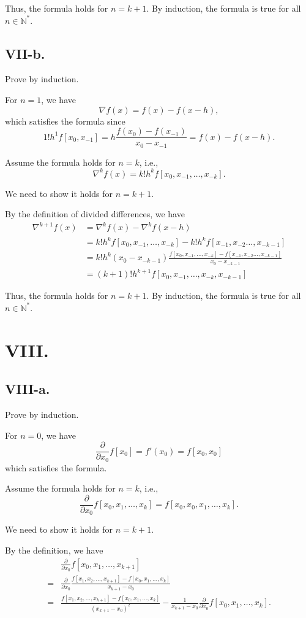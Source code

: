 \documentclass[a4paper]{article}
\begin{document}
Thus, the formula holds for $n = k + 1$. By induction, the formula is true for all $n \in \mathbb{N}^*$.

\subsection*{VII-b.}
Prove by induction.

For $n = 1$, we have
$$
  \nabla f(x)=f(x)-f(x-h),
$$
which satisfies the formula since
$$1!h^{1}f[x_0,x_{-1}]=h\frac{f(x_0)-f(x_{-1})}{x_0-x_{-1}}=f(x)-f(x-h).$$

Assume the formula holds for $n = k$, i.e.,
$$
\nabla^{k} f(x)=k!h^{k} f[x_0,x_{-1},\ldots,x_{-k}].
$$

We need to show it holds for $n = k + 1$.

By the definition of divided differences, we have
$$
\begin{aligned}
  \nabla^{k+1} f(x)&=\nabla^{k} f(x)-\nabla^{k} f(x-h)\\
  &=k!h^{k} f[x_0,x_{-1},\ldots,x_{-k}] - k!h^{k} f[x_{-1},x_{-2}\ldots,x_{-k-1}]\\
  &=k!h^{k} (x_0-x_{-k-1})\frac{f[x_0,x_{-1},\ldots,x_{-k}] - f[x_{-1},x_{-2}\ldots,x_{-k-1}]}{x_0-x_{-k-1}}\\
  &=(k+1)!h^{k+1}f[x_0,x_{-1},\ldots,x_{-k},x_{-k-1}]
\end{aligned}
$$

Thus, the formula holds for $n = k + 1$. By induction, the formula is true for all $n \in \mathbb{N}^*$.

\section*{VIII.}
\subsection*{VIII-a.}
Prove by induction.

For $n = 0$, we have
$$
\frac{\partial}{\partial x_0} f[x_0] = f'(x_0) = f[x_0, x_0]
$$
which satisfies the formula.

Assume the formula holds for $n = k$, i.e.,
$$
\frac{\partial}{\partial x_0} f[x_0, x_1, \dots, x_k] = f[x_0, x_0, x_1, \dots, x_k].
$$

We need to show it holds for $n = k + 1$.

By the definition, we have
$$ 
\begin{aligned}
  &\frac{\partial}{\partial x_0} f[x_0, x_1, \dots, x_{k+1}] \\
  =& \frac{\partial}{\partial x_0} \frac{f[x_1, x_2, \dots, x_{k+1}] - f[x_0, x_1, \dots, x_{k}]}{x_{k+1} - x_0}\\
  =& \frac{f[x_1, x_2, \dots, x_{k+1}] - f[x_0, x_1, \dots, x_{k}]}{(x_{k+1}-x_0)^2} - \frac{1}{x_{k+1}-x_0} \frac{\partial}{\partial x_0} f[x_0, x_1, \dots, x_{k}].\\
\end{aligned}
$$
\end{document}
